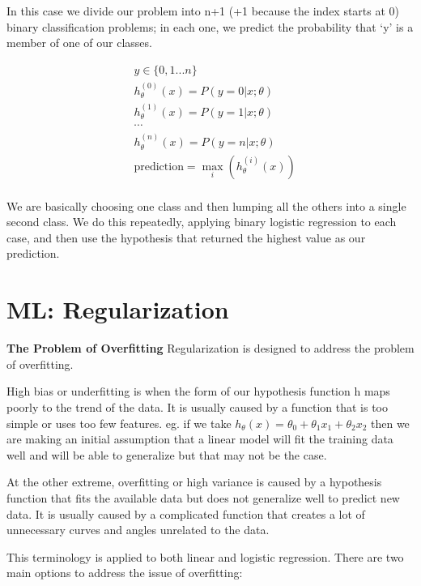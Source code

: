 In this case we divide our problem into n+1 (+1 because the index starts at 0) binary classification problems; in each one, we predict the probability that `y' is a member of one of our classes.

\begin{align*}
& y \in \lbrace0, 1 ... n\rbrace \\
& h_\theta^{(0)}(x) = P(y = 0 | x ; \theta) \\
& h_\theta^{(1)}(x) = P(y = 1 | x ; \theta) \\
& \cdots \\
& h_\theta^{(n)}(x) = P(y = n | x ; \theta) \\
& \mathrm{prediction} = \max_i( h_\theta ^{(i)}(x) )\\
\end{align*}

We are basically choosing one class and then lumping all the others into a single second class. We do this repeatedly, applying binary logistic regression to each case, and then use the hypothesis that returned the highest value as our prediction.

\section{ML: Regularization}
{\bf The Problem of Overfitting}
Regularization is designed to address the problem of overfitting.

High bias or underfitting is when the form of our hypothesis function h maps poorly to the trend of the data. It is usually caused by a function that is too simple or uses too few features. eg. if we take $h_\theta(x) = \theta_0 + \theta_1x_1 + \theta_2x_2$ then we are making an initial assumption that a linear model will fit the training data well and will be able to generalize but that may not be the case.

At the other extreme, overfitting or high variance is caused by a hypothesis function that fits the available data but does not generalize well to predict new data. It is usually caused by a complicated function that creates a lot of unnecessary curves and angles unrelated to the data.

This terminology is applied to both linear and logistic regression. There are two main options to address the issue of overfitting:

